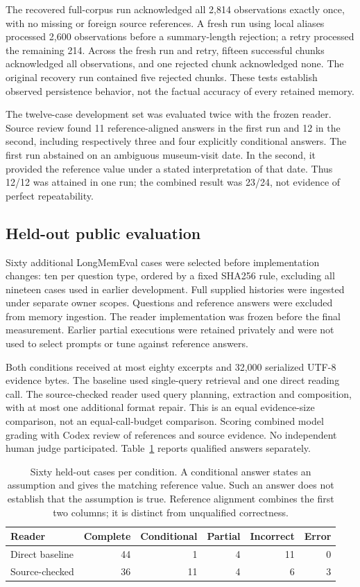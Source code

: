 The recovered full-corpus run acknowledged all 2,814 observations exactly
once, with no missing or foreign source references. A fresh run using local
aliases processed 2,600 observations before a summary-length rejection; a retry
processed the remaining 214. Across the fresh run and retry, fifteen successful
chunks acknowledged all observations, and one rejected chunk acknowledged none.
The original recovery run contained five rejected chunks. These tests establish
observed persistence behavior, not the factual accuracy of every retained memory.

The twelve-case development set was evaluated twice with the frozen reader.
Source review found 11 reference-aligned answers in the first run and 12 in the
second, including respectively three and four explicitly conditional answers.
The first run abstained on an ambiguous museum-visit date. In the second, it
provided the reference value under a stated interpretation of that date. Thus
12/12 was attained in one run; the combined result was 23/24, not evidence of
perfect repeatability.

\subsection{Held-out public evaluation}
Sixty additional LongMemEval cases were selected before implementation changes:
ten per question type, ordered by a fixed SHA256 rule, excluding all nineteen
cases used in earlier development. Full supplied histories were ingested under
separate owner scopes. Questions and reference answers were excluded from
memory ingestion. The reader implementation was frozen before the final
measurement. Earlier partial executions were retained privately and were not
used to select prompts or tune against reference answers.

Both conditions received at most eighty excerpts and 32,000 serialized UTF-8
evidence bytes. The baseline used single-query retrieval and one direct reading
call. The source-checked reader used query planning, extraction and composition,
with at most one additional format repair. This is an equal evidence-size
comparison, not an equal-call-budget comparison. Scoring combined model grading
with Codex review of references and source evidence. No independent human judge
participated. Table~\ref{tab:heldout-results} reports qualified answers separately.

\begin{table}[htbp]
\centering
\begin{tabular}{lrrrrr}
\toprule
Reader & Complete & Conditional & Partial & Incorrect & Error\\
\midrule
Direct baseline & 44 & 1 & 4 & 11 & 0 \\
Source-checked & 36 & 11 & 4 & 6 & 3 \\
\bottomrule
\end{tabular}
\caption{Sixty held-out cases per condition. A conditional answer states an
assumption and gives the matching reference value. Such an answer does not
establish that the assumption is true. Reference alignment combines the first
two columns; it is distinct from unqualified correctness.}
\label{tab:heldout-results}
\end{table}

